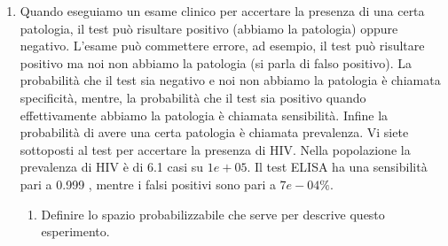 \endofdump
\usetikzlibrary{patterns}

\begin{enumerate}
	\item Quando eseguiamo un esame clinico per accertare la presenza di una certa patologia, il test può risultare positivo (abbiamo la patologia) oppure negativo. L'esame può commettere errore, ad esempio, il test può risultare positivo ma noi non abbiamo la patologia (si parla di falso positivo). La probabilità che il test sia negativo e noi non abbiamo la patologia è chiamata specificità, mentre, la probabilità che il test sia positivo quando effettivamente abbiamo la patologia è chiamata sensibilità. Infine la probabilità di avere una certa patologia è chiamata prevalenza. Vi siete sottoposti al test per accertare la presenza di HIV. Nella popolazione la prevalenza di HIV è di 6.1 casi su $1 e+05$. Il test ELISA ha una sensibilità pari a 0.999 , mentre i falsi positivi sono pari a $7 e-04 \%$.
	      \begin{enumerate}
		      \item Definire lo spazio probabilizzabile che serve per descrive questo esperimento.
            \vskip3mm 
            \begin{center}
\end{center}
\end{enumerate}
\end{enumerate}
